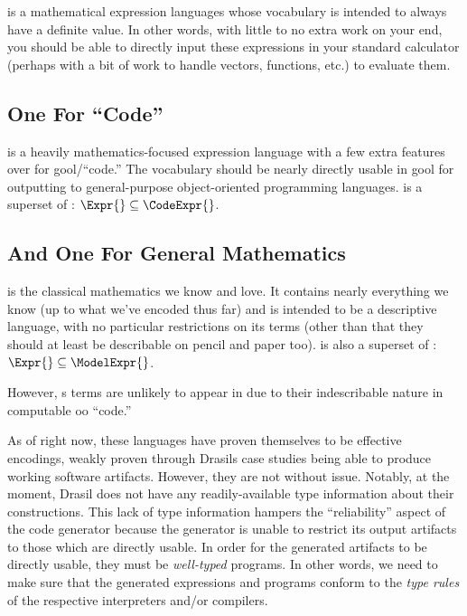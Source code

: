 \Expr{} is a mathematical expression languages whose vocabulary is intended to
always have a definite value. In other words, with little to no extra work on
your end, you should be able to directly input these expressions in your
standard calculator (perhaps with a bit of work to handle vectors, functions,
etc.) to evaluate them.

\subsection{One For \textquotedblleft{}Code\textquotedblright{}}

\CodeExpr{} is a heavily mathematics-focused expression language with a few
extra features over \Expr{} for \acs{gool}/``code.'' The vocabulary should be
nearly directly usable in \acs{gool} for outputting to general-purpose
object-oriented programming languages. \CodeExpr{} is a superset of \Expr{}:
\(\Expr{} \subseteq{} \CodeExpr{}\).

\subsection{And One For General Mathematics}

\ModelExpr{} is the classical mathematics we know and love. It contains nearly
everything we know (up to what we've encoded thus far) and is intended to be a
descriptive language, with no particular restrictions on its terms (other than
that they should at least be describable on pencil and paper too). \ModelExpr{}
is also a superset of \Expr{}: \(\Expr{} \subseteq{} \ModelExpr{}\).

However, \ModelExpr{}s terms are unlikely to appear in \CodeExpr{} due to their
indescribable nature in computable \acs{oo} ``code.''

As of right now, these languages have proven themselves to be effective
encodings, weakly proven through Drasils case studies being able to produce
working software artifacts. However, they are not without issue. Notably, at the
moment, Drasil does not have any readily-available type information about their
constructions. This lack of type information hampers the ``reliability'' aspect
of the code generator because the generator is unable to restrict its output
artifacts to those which are directly usable. In order for the generated
artifacts to be directly usable, they must be \textit{well-typed} programs. In
other words, we need to make sure that the generated expressions and programs
conform to the \textit{type rules} of the respective interpreters and/or
compilers.
